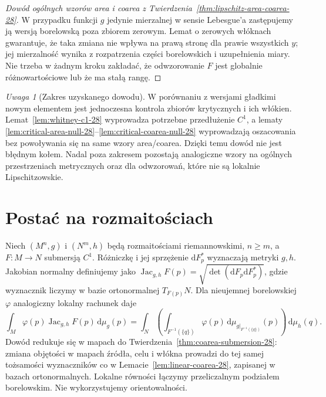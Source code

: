 \documentclass[11pt,a4paper,oneside]{book}
\numberwithin{equation}{chapter}
\theoremstyle{plain}
\theoremstyle{definition}
\theoremstyle{remark}
\newtheorem{uwaga}[twierdzenie]{Uwaga}
\begin{document}
\begin{proof}[Dowód ogólnych wzorów area i coarea z
Twierdzenia~\ref{thm:lipschitz-area-coarea-28}]
W przypadku funkcji $g$ jedynie mierzalnej
w sensie Lebesgue'a zastępujemy ją wersją
borelowską poza zbiorem zerowym. Lemat o
zerowych włóknach gwarantuje, że taka zmiana
nie wpływa na prawą stronę dla prawie wszystkich
$y$; jej mierzalność wynika z rozpatrzenia
części borelowskich i uzupełnienia miary.
Nie trzeba w żadnym kroku zakładać, że odwzorowanie
$F$ jest globalnie różnowartościowe lub że ma
stałą rangę.
\end{proof}

\begin{uwaga}[Zakres uzyskanego dowodu]
W porównaniu z wersjami gładkimi nowym elementem
jest jednoczesna kontrola zbiorów krytycznych i ich
włókien. Lemat~\ref{lem:whitney-c1-28} wyprowadza
potrzebne przedłużenie $C^1$, a lematy
\ref{lem:critical-area-null-28}--\ref{lem:critical-coarea-null-28}
wyprowadzają oszacowania bez powoływania się na
same wzory area/coarea. Dzięki temu dowód nie jest
błędnym kołem. Nadal poza zakresem pozostają
analogiczne wzory na ogólnych przestrzeniach
metrycznych oraz dla odwzorowań, które nie są
lokalnie Lipschitzowskie.
\end{uwaga}

\section{Postać na rozmaitościach}
Niech $(M^n,g)$ i $(N^m,h)$ będą rozmaitościami
riemannowskimi, $n\ge m$, a $F:M\to N$
submersją $C^1$. Różniczkę i jej sprzężenie
$\mathrm dF_p^*$ wyznaczają metryki $g,h$.
Jakobian normalny definiujemy jako
$\operatorname{Jac}_{g,h}F(p)=
\sqrt{\det(\mathrm dF_p\mathrm dF_p^*)}$,
gdzie wyznacznik liczymy w bazie ortonormalnej
$T_{F(p)}N$. Dla nieujemnej borelowskiej $\varphi$
analogiczny lokalny rachunek daje
\begin{equation}\label{eq:coarea-manifolds-28}
 \int_M\varphi(p)\operatorname{Jac}_{g,h}F(p)
 \,\mathrm d\mu_g(p)
 =\int_N\left(\int_{F^{-1}(\{q\})}\varphi(p)
 \,\mathrm d\mu_{g|_{F^{-1}(\{q\})}}(p)\right)
 \,\mathrm d\mu_h(q).
\end{equation}
Dowód redukuje się w mapach do
Twierdzenia~\ref{thm:coarea-submersion-28}:
zmiana objętości w mapach źródła, celu i włókna
prowadzi do tej samej tożsamości wyznaczników
co w Lemacie~\ref{lem:linear-coarea-28}, zapisanej
w bazach ortonormalnych. Lokalne równości
łączymy przeliczalnym podziałem borelowskim.
Nie wykorzystujemy orientowalności.
\end{document}
